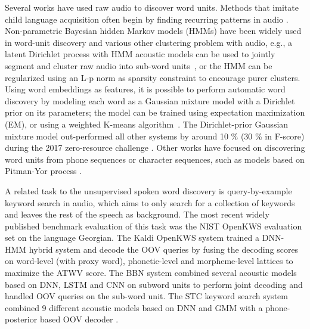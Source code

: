 \documentclass[a4paper]{article}
\begin{document}
Several works have used raw audio to discover word units.
Methods that imitate child language acquisition often begin by finding
recurring patterns in audio \cite{Rasanen2015,Park2008}.
Non-parametric Bayesian hidden Markov models (HMMs) have been widely used in word-unit discovery and various other clustering problem with audio,
e.g., a latent Dirichlet process with HMM acoustic models can be used to jointly segment and cluster raw audio into sub-word units~\cite{Lee2012,Ondel2018},
or the HMM can be regularized using an
L-p norm as sparsity constraint to encourage purer clusters\cite{Bharadwaj2013}.
Using word embeddings as features, it is possible to perform automatic word discovery by modeling each word as a Gaussian mixture model with a Dirichlet prior on its parameters; the model can be trained using expectation maximization (EM), or using a weighted K-means algorithm~\cite{Kamper2017}.
The Dirichlet-prior Gaussian mixture model out-performed all other systems by around 10 \% (30 \% in F-score) during the 2017 zero-resource challenge \cite{Dunbar2017}.
Other works have focused on discovering word units from phone sequences or character sequences, such as models based on Pitman-Yor process \cite{Johnson2007}.  

A related task to the unsupervised spoken word discovery is query-by-example keyword search in audio, which aims to only search for a collection of keywords and leaves the rest of the speech as background.
The most recent widely published benchmark evaluation of this task was the
NIST OpenKWS evaluation set on the language Georgian.
The Kaldi OpenKWS system \cite{Trmal2017} trained a DNN-HMM hybrid system and decode the OOV queries by fusing the decoding scores on word-level (with proxy word), phonetic-level and morpheme-level lattices to maximize the ATWV score.
The BBN system \cite{Alumae16} combined several acoustic models based on DNN, LSTM and CNN on subword units to perform joint decoding and handled OOV queries on the sub-word unit.
The STC keyword search system \cite{Medennikov2017} combined 9 different acoustic models based on DNN and GMM with a phone-posterior based OOV decoder \cite{Khokhlov2017}.  
\end{document}

